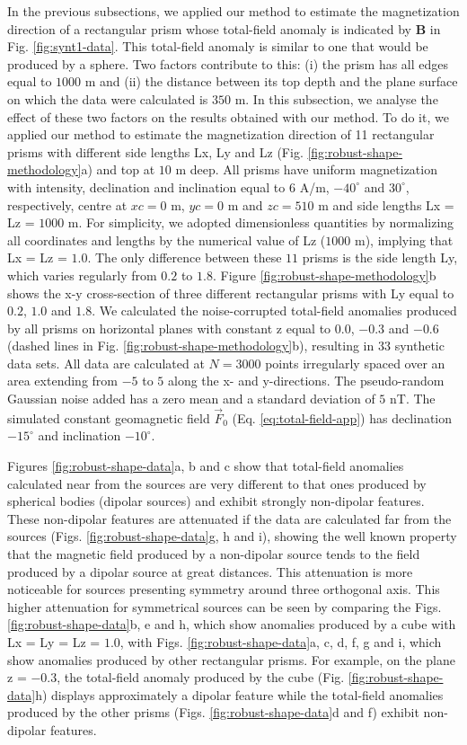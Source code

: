 \documentclass[journal abbreviation, npg]{copernicus}
\begin{document}
In the previous subsections, we applied our method to estimate the magnetization direction of a rectangular prism whose total-field anomaly is indicated by $\textbf{B}$ in Fig. \ref{fig:synt1-data}. This total-field anomaly is similar to one that would be produced by a sphere. Two factors contribute to this: (i) the prism has all edges equal to $1000$ m and (ii) the distance between its top depth and the plane surface on which the data were calculated is $350$ m. In this subsection, we analyse the effect of these two factors on the results obtained with our method. To do it, we applied our method to estimate the magnetization direction of 11 rectangular prisms with different side lengths Lx, Ly and Lz (Fig. \ref{fig:robust-shape-methodology}a) and top at $10$ m deep. All prisms have uniform magnetization with intensity, declination and inclination equal to $6$ A/m, $-40^{\circ}$ and $30^{\circ}$, respectively, centre at $xc = 0$ m, $yc = 0$ m and $zc = 510$ m and side lengths Lx = Lz = $1000$ m. For simplicity, we adopted dimensionless quantities by normalizing all coordinates and lengths by the numerical value of Lz ($1000$ m), implying that Lx = Lz = $1.0$. The only difference between these $11$ prisms is the side length Ly, which varies regularly from $0.2$ to $1.8$. Figure \ref{fig:robust-shape-methodology}b shows the x-y cross-section of three different rectangular prisms with Ly equal to $0.2$, $1.0$ and $1.8$. We calculated the noise-corrupted total-field anomalies produced by all prisms on horizontal planes with constant z equal to $0.0$, $-0.3$ and $-0.6$ (dashed lines in Fig. \ref{fig:robust-shape-methodology}b), resulting in $33$ synthetic data sets. All data are calculated at $N = 3000$ points irregularly spaced over an area extending from $-5$ to $5$ along the x- and y-directions. The pseudo-random Gaussian noise added has a zero mean and a standard deviation of $5$ nT. The simulated constant geomagnetic field $\vec{F}_{0}$ (Eq. \ref{eq:total-field-app}) has declination $-15^{\circ}$ and inclination $-10^{\circ}$.

Figures \ref{fig:robust-shape-data}a, b and c show that total-field anomalies calculated near from the sources are very different to that ones produced by spherical bodies (dipolar sources) and exhibit strongly non-dipolar features. These non-dipolar features are attenuated if the data are calculated far from the sources (Figs. \ref{fig:robust-shape-data}g, h and i), showing the well known property that the magnetic field produced by a non-dipolar source tends to the field produced by a dipolar source at great distances. This attenuation is more noticeable for sources presenting symmetry around three orthogonal axis. This higher attenuation for symmetrical sources can be seen by comparing the Figs. \ref{fig:robust-shape-data}b, e and h, which show anomalies produced by a cube with Lx = Ly = Lz = $1.0$, with Figs. \ref{fig:robust-shape-data}a, c, d, f, g and i, which show anomalies produced by other rectangular prisms. For example, on the plane z = $-0.3$, the total-field anomaly produced by the cube (Fig. \ref{fig:robust-shape-data}h) displays  approximately a dipolar feature while the total-field anomalies produced by the other prisms (Figs. \ref{fig:robust-shape-data}d and f) exhibit non-dipolar features.
\end{document}
